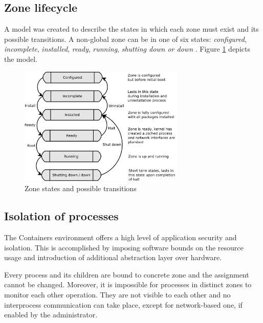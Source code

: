 \documentclass[11pt,openany]{book}
\begin{document}
      \subsection{Zone lifecycle}
      \label{sub:}

        A model was created to describe the states in which each zone must exist and its possible transitions. A
        non-global zone can be in one of six states: \textit{configured}, \textit{incomplete}, \textit{installed},
        \textit{ready}, \textit{running}, \textit{shutting down or down} \cite{sag}. Figure \ref{fig:sol:lifecycle}
        depicts the model.

        \begin{figure}[H]
          \begin{center}
            \includegraphics[width=0.7\textwidth]{img/solaris/zone_states.pdf}
          \end{center}

          \caption{Zone states and possible transitions}
          \label{fig:sol:lifecycle}
        \end{figure}


      \subsection{Isolation of processes}
      \label{sub:}

        The Containers environment offers a high level of application security and isolation. This is accomplished by
        imposing software bounds on the resource usage and introduction of additional abstraction layer over hardware.

        Every process and its children are bound to concrete zone and the assignment cannot be changed. Moreover, it is
        impossible for processes in distinct zones to monitor each other operation. They are not visible to each other
        and no interprocess communication can take place, except for network-based one, if enabled by the administrator.
\end{document}
